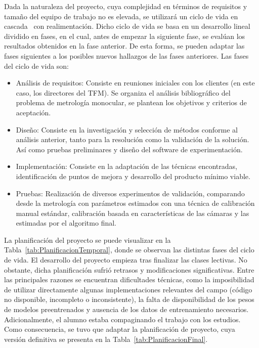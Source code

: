 Dada la naturaleza del proyecto, cuya complejidad en términos de requisitos y tamaño
del equipo de trabajo no es elevada, se utilizará un ciclo de vida en cascada~\cite{ModeloEnCascada} con realimentación.
Dicho ciclo de vida se basa en un desarrollo lineal dividido en fases, en el cual, antes
de empezar la siguiente fase, se evalúan los resultados obtenidos en la fase anterior.
De esta forma, se pueden adaptar las fases siguientes a los posibles
nuevos hallazgos de las fases anteriores.
Las fases del ciclo de vida son:
\begin{itemize}
  \item Análisis de requisitos: Consiste en reuniones iniciales con los clientes
    (en este caso, los directores del TFM). Se organiza el análisis bibliográfico
    del problema de metrología monocular, se plantean los objetivos y criterios de aceptación.
  \item Diseño: Consiste en la investigación y selección de métodos conforme
    al análisis anterior, tanto para la resolución como la validación de la solución.
    Así como pruebas preliminares y diseño del software de experimentación.
  \item Implementación: Consiste en la adaptación de las técnicas encontradas,
      identificación de puntos de mejora y desarrollo del producto mínimo viable.
  \item Pruebas: Realización de diversos experimentos de validación,
      comparando desde la metrología con parámetros estimados con una técnica de calibración manual estándar,
      calibración basada en características de las cámaras y las estimadas por el algoritmo final.
\end{itemize}

La planificación del proyecto se puede visualizar en la Tabla~\ref{tab:PlanificacionTemporal},
donde se observan las distintas fases del ciclo de vida. El desarrollo del proyecto empieza
tras finalizar las clases lectivas. No obstante, dicha planificación sufrió retrasos y modificaciones significativas.
Entre las principales razones se encuentran dificultades técnicas, como la imposibilidad de utilizar
directamente algunas implementaciones relevantes del campo (código no disponible, incompleto o inconsistente),
la falta de disponibilidad de los pesos de modelos preentrenados y ausencia de los datos de entrenamiento
necesarios. Adicionalmente, el alumno estaba compaginando el trabajo con los estudios.
Como consecuencia, se tuvo que adaptar la planificación de proyecto, cuya versión definitiva
se presenta en la Tabla~\ref{tab:PlanificacionFinal}.


